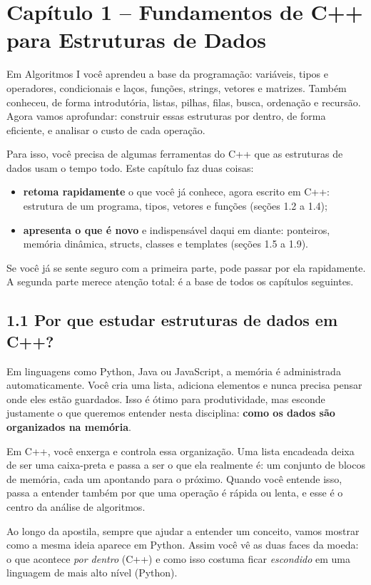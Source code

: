\section{Capítulo 1 -- Fundamentos de C++ para Estruturas de Dados}

Em Algoritmos I você aprendeu a base da programação: variáveis, tipos e operadores, condicionais e laços, funções, strings, vetores e matrizes. Também conheceu, de forma introdutória, listas, pilhas, filas, busca, ordenação e recursão. Agora vamos aprofundar: construir essas estruturas por dentro, de forma eficiente, e analisar o custo de cada operação.

Para isso, você precisa de algumas ferramentas do C++ que as estruturas de dados usam o tempo todo. Este capítulo faz duas coisas:

\begin{itemize}
  \item \textbf{retoma rapidamente} o que você já conhece, agora escrito em C++: estrutura de um programa, tipos, vetores e funções (seções 1.2 a 1.4);
  \item \textbf{apresenta o que é novo} e indispensável daqui em diante: ponteiros, memória dinâmica, structs, classes e templates (seções 1.5 a 1.9).
\end{itemize}

Se você já se sente seguro com a primeira parte, pode passar por ela rapidamente. A segunda parte merece atenção total: é a base de todos os capítulos seguintes.

\subsection{1.1 Por que estudar estruturas de dados em C++?}

Em linguagens como Python, Java ou JavaScript, a memória é administrada automaticamente. Você cria uma lista, adiciona elementos e nunca precisa pensar onde eles estão guardados. Isso é ótimo para produtividade, mas esconde justamente o que queremos entender nesta disciplina: \textbf{como os dados são organizados na memória}.

Em C++, você enxerga e controla essa organização. Uma lista encadeada deixa de ser uma caixa-preta e passa a ser o que ela realmente é: um conjunto de blocos de memória, cada um apontando para o próximo. Quando você entende isso, passa a entender também por que uma operação é rápida ou lenta, e esse é o centro da análise de algoritmos.

Ao longo da apostila, sempre que ajudar a entender um conceito, vamos mostrar como a mesma ideia aparece em Python. Assim você vê as duas faces da moeda: o que acontece \textit{por dentro} (C++) e como isso costuma ficar \textit{escondido} em uma linguagem de mais alto nível (Python).

